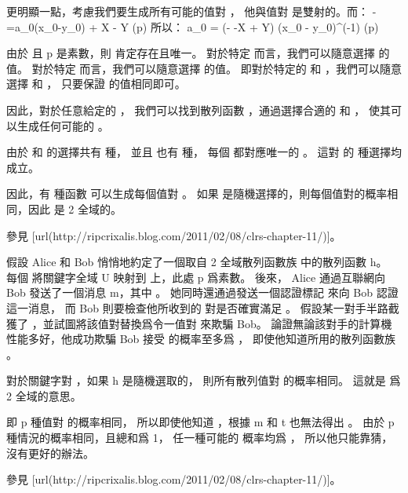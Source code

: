 更明顯一點，考慮我們要生成所有可能的值對 \m{\alpha,\beta}，
他與值對 \m{\alpha,\alpha-\beta} 是雙射的。而：
\startformula
\alpha-\beta=a_0(x_0-y_0) + X - Y (\mod p)
\stopformula
所以：
\startformula
a_0 = (\alpha - \beta -X + Y) (x_0 - y_0)^{(-1)} (\mod p)
\stopformula

由於  且 p 是素數，則  肯定存在且唯一。
對於特定  而言，我們可以隨意選擇 \m{\alpha-\beta} 的值。
對於特定  而言，我們可以隨意選擇 \m{\alpha} 的值。
即對於特定的  和 ，我們可以隨意選擇 \m{\alpha} 和 \m{\beta}，
只要保證  的值相同即可。

因此，對於任意給定的 ，
我們可以找到散列函數 ，通過選擇合適的  和 ，
使其可以生成任何可能的 \m{\langle\alpha,\beta\rangle}。

由於  和  的選擇共有  種，
並且 \m{\langle\alpha,\beta\rangle} 也有  種，
每個 \m{\langle\alpha,\beta\rangle} 都對應唯一的 。
這對  的  種選擇均成立。

因此，有  種函數  可以生成每個值對 \m{\langle\alpha,\beta\rangle}。
如果  是隨機選擇的，則每個值對的概率相同，因此  是 2 全域的。

參見 [url(http://ripcrixalis.blog.com/2011/02/08/clrs-chapter-11/)]。
\stopANSWER

\startitem%
假設 Alice 和 Bob 悄悄地約定了一個取自 2 全域散列函數族  中的散列函數 h。
每個  將關鍵字全域 U 映射到  上，此處 p 爲素數。
後來， Alice 通過互聯網向 Bob 發送了一個消息 m，其中 。
她同時還通過發送一個認證標記  來向 Bob 認證這一消息，
而 Bob 則要檢查他所收到的  對是否確實滿足 。
假設某一對手半路截獲了 ，並試圖將該值對替換爲令一值對  來欺騙 Bob。
論證無論該對手的計算機性能多好，他成功欺騙 Bob 接受  的概率至多爲 ，
即使他知道所用的散列函數族 。
\stopitem

\startANSWER
對於關鍵字對 ，如果 h 是隨機選取的，
則所有散列值對  的概率相同。
這就是  爲 2 全域的意思。

即 p 種值對  的概率相同，
所以即使他知道 ，根據 m 和 t 也無法得出 。
由於 p 種情況的概率相同，且總和爲 1，
任一種可能的  概率均爲 ，
所以他只能靠猜，沒有更好的辦法。

參見 [url(http://ripcrixalis.blog.com/2011/02/08/clrs-chapter-11/)]。
\stopANSWER
\stopigBase
\stopPROBLEM

\stopsubject%
